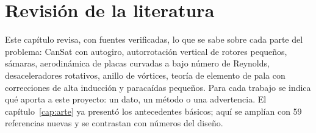 \chapter{Revisión de la literatura}\label{cap:literatura}

Este capítulo revisa, con fuentes verificadas, lo que se sabe sobre cada parte del
problema: CanSat con autogiro, autorrotación vertical de rotores pequeños, sámaras,
aerodinámica de placas curvadas a bajo número de Reynolds, desaceleradores rotativos,
anillo de vórtices, teoría de elemento de pala con correcciones de alta inducción y
paracaídas pequeños. Para cada trabajo se indica qué aporta a este proyecto: un dato, un
método o una advertencia. El capítulo~\ref{cap:arte} ya presentó los antecedentes
básicos; aquí se amplían con 59 referencias nuevas y se contrastan con números del diseño.

